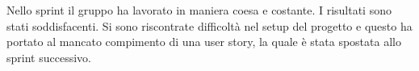 Nello sprint il gruppo ha lavorato in maniera coesa e costante. I risultati sono stati soddisfacenti. Si sono riscontrate difficoltà nel setup del progetto e questo ha portato al mancato compimento di una user story, la quale è stata spostata allo sprint successivo.